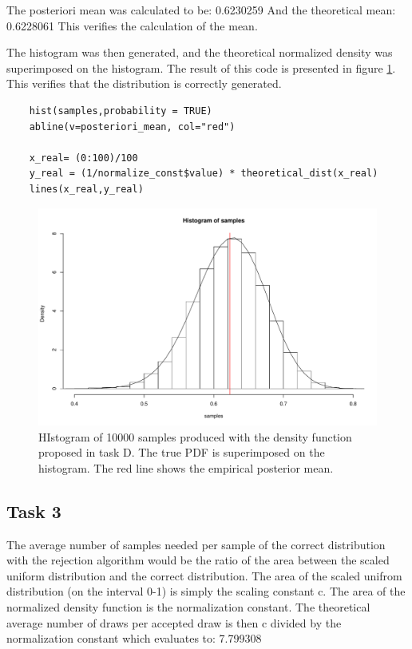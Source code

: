 The posteriori mean was calculated to be: 0.6230259
And the theoretical mean: 0.6228061
This verifies the calculation of the mean.

The histogram was then generated, and the theoretical normalized density was superimposed on the histogram. The result of this code is presented in figure \ref{fig:PD2_histogram}. This verifies that the distribution is correctly generated.
\begin{lstlisting}
    hist(samples,probability = TRUE)
    abline(v=posteriori_mean, col="red")
    
    x_real= (0:100)/100
    y_real = (1/normalize_const$value) * theoretical_dist(x_real)
    lines(x_real,y_real)
\end{lstlisting}

\begin{figure}[h!]
    \centering
    \includegraphics[width=\textwidth]{Ov1_D2_hist}
    \caption{HIstogram of 10000 samples produced with the density function proposed in task D. The true PDF is superimposed on the histogram. The red line shows the empirical posterior mean.}
    \label{fig:PD2_histogram}
\end{figure}

\subsection{Task 3}

The average number of samples needed per sample of the correct distribution with the rejection algorithm would be the ratio of the area between the scaled uniform distribution and the correct distribution. The area of the scaled unifrom distribution (on the interval 0-1) is simply the scaling constant c. The area of the normalized density function is the normalization constant. The theoretical average number of draws per accepted draw is then c divided by the normalization constant which evaluates to: 7.799308


